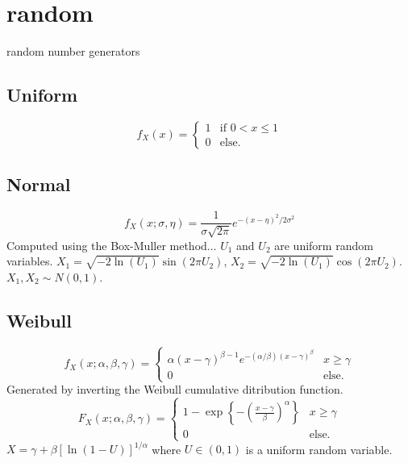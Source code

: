 % 
%

\newpage
\section{random}
\label{module:random}
random number generators

\subsection{Uniform}
\[
    f_X(x) =
    \begin{cases}
        1 & \text{if $0 < x \le 1$} \\
        0 & \text{else}.
    \end{cases}
\]

\subsection{Normal}
\[
    f_X(x;\sigma,\eta) =
        \frac{1}{\sigma \sqrt{2 \pi}}
        e^{-\left(x-\eta\right)^2/{2\sigma^2}}
\]
Computed using the Box-Muller method...
$U_1$ and $U_2$ are uniform random variables.
$X_1 = \sqrt{-2\ln(U_1)} \sin\left(2 \pi U_2\right)$,
$X_2 = \sqrt{-2\ln(U_1)} \cos\left(2 \pi U_2\right)$.
$X_1, X_2 \sim N(0,1)$.

\subsection{Weibull}
\[
    f_X(x;\alpha,\beta,\gamma) =
    \begin{cases}
        \alpha(x-\gamma)^{\beta-1}
        e^{-(\alpha/\beta)(x-\gamma)^\beta} & \text{$x \ge \gamma$} \\
        0 &                                   \text{else}.
    \end{cases}
\]
Generated by inverting the Weibull cumulative ditribution function.
\[
    F_X(x;\alpha,\beta,\gamma) =
    \begin{cases}
        1 - \exp\left\{
            -\left(\frac{x-\gamma}{\beta}\right)^\alpha
        \right\} &                            \text{$x \ge \gamma$} \\
        0 &                                   \text{else}.
    \end{cases}
\]
$X = \gamma + \beta\left[ \ln\left(1 - U\right) \right]^{1/\alpha}$
where $U \in (0,1)$ is a uniform random variable.


